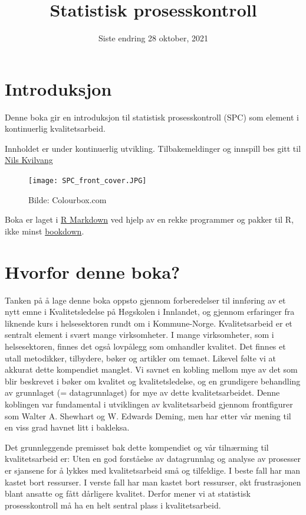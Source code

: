 \documentclass[
]{book}
\title{Statistisk prosesskontroll}
\author{}
\date{\vspace{-2.5em}Siste endring 28 oktober, 2021}
\begin{document}
\maketitle

{
\setcounter{tocdepth}{1}
\tableofcontents
}
\hypertarget{introduksjon}{%
\chapter*{Introduksjon}\label{introduksjon}}

Denne boka gir en introduksjon til statistisk prosesskontroll (SPC) som element i kontinuerlig kvalitetsarbeid.

Innholdet er under kontinuerlig utvikling. Tilbakemeldinger og innspill bes gitt til \href{mailto:nils.kvilvang@inn.no}{Nils Kvilvang}

\begin{figure}
\centering
\texttt{[image: SPC\_front\_cover.JPG]}
\caption{Bilde: Colourbox.com}
\end{figure}

Boka er laget i \href{http://rmarkdown.rstudio.com}{R Markdown} ved hjelp av en rekke programmer og pakker til R, ikke minst \href{http://https://bookdown.org/yihui/bookdown/}{bookdown}.

\hypertarget{hvorfor-denne-boka}{%
\chapter{Hvorfor denne boka?}\label{hvorfor-denne-boka}}

Tanken på å lage denne boka oppsto gjennom forberedelser til innføring av et nytt emne i Kvalitetsledelse på Høgskolen i Innlandet, og gjennom erfaringer fra liknende kurs i helsesektoren rundt om i Kommune-Norge. Kvalitetsarbeid er et sentralt element i svært mange virksomheter. I mange virksomheter, som i helsesektoren, finnes det også lovpålegg som omhandler kvalitet. Det finnes et utall metodikker, tilbydere, bøker og artikler om temaet. Likevel følte vi at akkurat dette kompendiet manglet. Vi savnet en kobling mellom mye av det som blir beskrevet i bøker om kvalitet og kvalitetsledelse, og en grundigere behandling av grunnlaget (= datagrunnlaget) for mye av dette kvalitetsarbeidet. Denne koblingen var fundamental i utviklingen av kvalitetsarbeid gjennom frontfigurer som Walter A. Shewhart og W. Edwards Deming, men har etter vår mening til en viss grad havnet litt i bakleksa.

Det grunnleggende premisset bak dette kompendiet og vår tilnærming til kvalitetsarbeid er: Uten en god forståelse av datagrunnlag og analyse av prosesser er sjansene for å lykkes med kvalitetsarbeid små og tilfeldige. I beste fall har man kastet bort ressurser. I verste fall har man kastet bort ressurser, økt frustrasjonen blant ansatte og fått dårligere kvalitet. Derfor mener vi at statistisk prosesskontroll må ha en helt sentral plass i kvalitetsarbeid.
\end{document}
